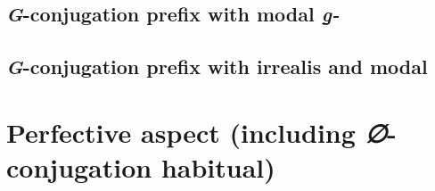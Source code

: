 \documentclass[12pt,letterpaper,landscape,oneside,article]{memoir}
\begin{document}
\subsection{\textit{G}-conjugation prefix with modal \textit{g̱-}}

\subsection{\textit{G}-conjugation prefix with irrealis and modal}

\clearpage

\section{Perfective aspect (including \textit{∅}-conjugation habitual)}
\end{document}

